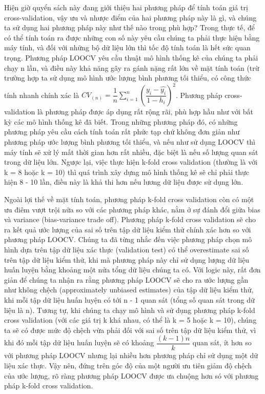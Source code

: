 \documentclass[
]{article}
\begin{document}
Hiện giờ quyển sách này đang giới thiệu hai phương pháp để tính toán giá trị cross-validation, vậy ưu và nhược điểm của hai phương pháp này là gì, và chúng ta sử dụng hai phương pháp này như thế nào trong phù hợp? Trong thực tế, để có thể tính toán ra được những con số này yêu cầu chúng ta phải thực hiện bằng máy tính, và đối với những bộ dữ liệu lớn thì tốc độ tính toán là hết sức quan trọng. Phương pháp LOOCV yêu cầu thuật mô hình thống kê của chúng ta phải chạy n lần, và điều này khả năng gây ra gánh nặng rất lớn về mặt tính toán (trừ trường hợp ta sử dụng mô hình ước lượng bình phương tối thiểu, có công thức tính nhanh chính xác là \(CV_{(n)} = \dfrac{1}{n} \sum\limits_{i=1}^{n} \left(\dfrac{y_i - \hat{y_i}}{1 - h_i}\right)^2\).
Phương pháp cross-validation là phương pháp được áp dụng rất rộng rãi, phù hợp hầu như với bất kỳ các mô hình thống kê đã biết. Trong những phương pháp đó, có những phương pháp yêu cầu cách tính toán rất phức tạp chứ không đơn giản như phương pháp ước lượng bình phương tối thiểu, và nếu như sử dụng LOOCV thì máy tính sẽ xử lý mất thời gian hơn rất nhiều, đặc biệt là nếu số lượng quan sát trong dữ liệu lớn. Ngược lại, việc thực hiện k-fold cross validation (thường là với k = 8 hoặc k = 10) thì quá trình xây dựng mô hình thống kê sẽ chỉ phải thực hiện 8 - 10 lần, điều này là khả thi hơn nếu lương dữ liệu được sử dụng lớn.

Ngoài lợi thế về mặt tính toán, phương pháp k-fold cross validation còn có một ưu điêm vượt trội nữa so với các phương pháp khác, nằm ở sự đánh đổi giữa bias và variance (bias-variance trade off). Phương pháp k-fold cross validation sẽ cho ra kết quả ước lượng của sai số trên tập dữ liệu kiểm thử chính xác hơn so với phương pháp LOOCV. Chúng ta đã từng nhắc đến việc phương pháp chọn mô hình dựa trên tập dữ liệu xác thực (validation test) có thể overestimate sai số trên tập dữ liệu kiểm thử, khi mà phương pháp này chỉ sử dụng lượng dữ liệu huấn luyện bằng khoảng một nửa tổng dữ liệu chúng ta có. Với logic này, rất đơn giản để chúng ta nhận ra rằng phương pháp LOOCV sẽ cho ra ước lượng gần như không chệch (approximately unbiased estimates) của tập dữ liệu kiểm thử, khi mỗi tập dữ liệu huấn luyện có tới n - 1 quan sát (tổng số quan sát trong dữ liệu là n). Tương tự, khi chúng ta chạy mô hình và sử dụng phương pháp k-fold cross validation (với các giá trị k khá nhau, có thể là k = 5 hoặc k = 10), chúng ta sẽ có được mức độ chệch vừa phải đối với sai số trên tập dữ liệu kiểm thử, vì khi đó mỗi tập dữ liệu huấn luyện sẽ có khoảng \(\dfrac{(k-1)n}{k}\) quan sát, ít hơn so với phương pháp LOOCV nhưng lại nhiều hơn phương pháp chỉ sử dụng một dữ liệu xác thực. Vậy nên, đứng trên góc độ của một người ưu tiên giảm độ chệch của ước lượng, rõ ràng phương pháp LOOCV được ưa chuộng hơn só với phương pháp k-fold cross validation.
\end{document}
